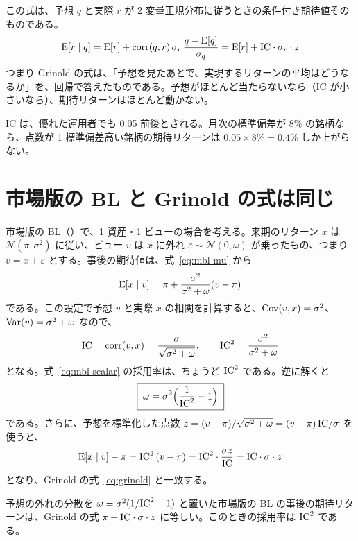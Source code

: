 この式は、予想 $q$ と実際 $r$ が 2 変量正規分布に従うときの条件付き期待値そのものである。
\begin{equation}
\mathrm{E}[r\mid q]=\mathrm{E}[r]+\mathrm{corr}(q,r)\,\sigma_r\,\frac{q-\mathrm{E}[q]}{\sigma_q}=\mathrm{E}[r]+\mathrm{IC}\cdot\sigma_r\cdot z
\end{equation}
つまり Grinold の式は、「予想を見たあとで、実現するリターンの平均はどうなるか」を、回帰で答えたものである。予想がほとんど当たらないなら（IC が小さいなら）、期待リターンはほとんど動かない。

IC は、優れた運用者でも 0.05 前後とされる。月次の標準偏差が 8\% の銘柄なら、点数が 1 標準偏差高い銘柄の期待リターンは $0.05\times8\%=0.4\%$ しか上がらない。

\section{市場版の BL と Grinold の式は同じ}\label{sec:grinold-bl}

市場版の BL（）で、1 資産・1 ビューの場合を考える。来期のリターン $x$ は $\mathcal N(\pi,\sigma^2)$ に従い、ビュー $v$ は $x$ に外れ $\varepsilon\sim\mathcal N(0,\omega)$ が乗ったもの、つまり $v=x+\varepsilon$ とする。事後の期待値は、式~\eqref{eq:mbl-mu} から
\begin{equation}
\mathrm{E}[x\mid v]=\pi+\frac{\sigma^2}{\sigma^2+\omega}(v-\pi)
\label{eq:mbl-scalar}
\end{equation}
である。この設定で予想 $v$ と実際 $x$ の相関を計算すると、$\mathrm{Cov}(v,x)=\sigma^2$、$\mathrm{Var}(v)=\sigma^2+\omega$ なので、
\begin{equation}
\mathrm{IC}=\mathrm{corr}(v,x)=\frac{\sigma}{\sqrt{\sigma^2+\omega}},\qquad
\mathrm{IC}^2=\frac{\sigma^2}{\sigma^2+\omega}
\end{equation}
となる。式~\eqref{eq:mbl-scalar} の採用率は、ちょうど $\mathrm{IC}^2$ である。逆に解くと
\begin{equation}
\boxed{\;\omega=\sigma^2\Bigl(\frac{1}{\mathrm{IC}^2}-1\Bigr)\;}
\label{eq:omega-ic}
\end{equation}
である。さらに、予想を標準化した点数 $z=(v-\pi)/\sqrt{\sigma^2+\omega}=(v-\pi)\,\mathrm{IC}/\sigma$ を使うと、
\begin{equation}
\mathrm{E}[x\mid v]-\pi=\mathrm{IC}^2\,(v-\pi)=\mathrm{IC}^2\cdot\frac{\sigma z}{\mathrm{IC}}=\mathrm{IC}\cdot\sigma\cdot z
\end{equation}
となり、Grinold の式~\eqref{eq:grinold} と一致する。

\begin{thmbox}
予想の外れの分散を $\omega=\sigma^2(1/\mathrm{IC}^2-1)$ と置いた市場版の BL の事後の期待リターンは、Grinold の式 $\pi+\mathrm{IC}\cdot\sigma\cdot z$ に等しい。このときの採用率は $\mathrm{IC}^2$ である。
\end{thmbox}

